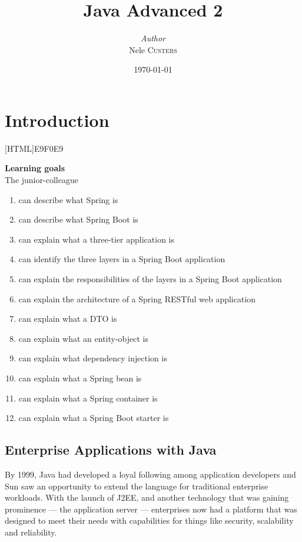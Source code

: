 \documentclass[a4paper, 12pt]{report}
\institute{Hogeschool PXL}
\title{Java Advanced 2}
\author{\textit{Author}\\Nele \textsc{Custers}}
\date{\today}
\begin{document}
    \maketitle
    \romantableofcontents
    



    







\chapter{Introduction}
    
[HTML]{E9F0E9}{\parbox{\textwidth}{%
\noindent \textbf{Learning goals}\\
The junior-colleague
\begin{enumerate}[nolistsep]
\item can describe what Spring is
\item can describe what Spring Boot is
\item can explain what a three-tier application is
\item can identify the three layers in a Spring Boot application
\item can explain the responsibilities of the layers in a Spring Boot application
\item can explain the architecture of a Spring RESTful web application
\item can explain what a DTO is
\item can explain what an entity-object is
\item can explain what dependency injection is
\item can explain what a Spring bean is
\item can explain what a Spring container is
\item can explain what a Spring Boot starter is
\end{enumerate}}}


\section{Enterprise Applications with Java}
By 1999, Java had developed a loyal following among application developers and Sun saw an opportunity to extend the language for traditional enterprise workloads. With the launch of J2EE, and another technology that was gaining prominence — the application server — enterprises now had a platform that was designed to meet their needs with capabilities for things like security, scalability and reliability.
\end{document}
